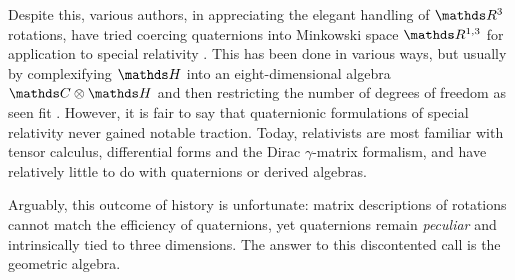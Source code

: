 Despite this, various authors, in appreciating the elegant handling of $\RR^3$ rotations, have tried coercing quaternions into Minkowski space $\RR^{1,3}$ for application to special relativity \cite{silberstein1912quat-sr,deleo1996quat-sr,dirac1944quat-sr}.
This has been done in various ways, but usually by complexifying $\HH$ into an eight-dimensional algebra $\CC\otimes\HH$ and then restricting the number of degrees of freedom as seen fit \cite{berry2020quat-sr,berry2021quat-sr}.
However, it is fair to say that quaternionic formulations of special relativity never gained notable traction.
Today, relativists are most familiar with tensor calculus, differential forms and the Dirac $γ$-matrix formalism, and have relatively little to do with quaternions or derived algebras. 

Arguably, this outcome of history is unfortunate: matrix descriptions of rotations cannot match the efficiency of quaternions, yet quaternions remain \emph{peculiar} and intrinsically tied to three dimensions.
The answer to this discontented call is the geometric algebra.
